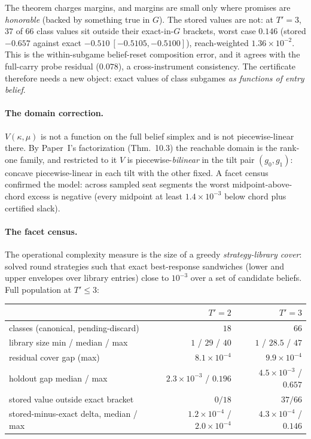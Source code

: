 \documentclass[11pt]{article}
\theoremstyle{plain}
\theoremstyle{definition}
\theoremstyle{remark}
\newcommand{\game}{\ensuremath{G}}
\begin{document}
The theorem charges margins, and margins are small only where promises
are \emph{honorable} (backed by something true in $\game$). The
stored values are not: at $T'{=}3$, $37$ of $66$ class values sit
outside their exact-in-$\game$ brackets, worst case $0.146$ (stored
$-0.657$ against exact $-0.510\ [-0.5105,-0.5100]$), reach-weighted
$1.36\times10^{-2}$. This is the within-subgame belief-reset
composition error, and it agrees with the full-carry probe residual
($0.078$), a cross-instrument consistency. The certificate
therefore needs a new object: exact values of class subgames \emph{as
functions of entry belief}.

\paragraph{The domain correction.} $V(\kappa,\mu)$ is not a function
on the full belief simplex and is not piecewise-linear there. By
Paper~I's factorization (Thm.~10.3) the reachable domain is the
rank-one family, and restricted to it $V$ is
piecewise-\emph{bilinear} in the tilt pair $(g_0,g_1)$: concave
piecewise-linear in each tilt with the other fixed. A facet census
confirmed the model: across sampled seat segments the worst
midpoint-above-chord excess is negative (every midpoint at least
$1.4\times10^{-3}$ below chord plus certified slack).

\paragraph{The facet census.} The operational complexity measure is
the size of a greedy \emph{strategy-library cover}: solved round
strategies such that exact best-response sandwiches (lower and upper
envelopes over library entries) close to $10^{-3}$ over a set of
candidate beliefs. Full population at $T'\le3$:

\begin{center}\small
\begin{tabular}{@{}lrr@{}}
\toprule
 & $T'=2$ & $T'=3$\\
\midrule
classes (canonical, pending-discard) & $18$ & $66$\\
library size min / median / max & $1$ / $29$ / $40$ & $1$ / $28.5$ / $47$\\
residual cover gap (max) & $8.1\times10^{-4}$ & $9.9\times10^{-4}$\\
holdout gap median / max & $2.3\times10^{-3}$ / $0.196$ & $4.5\times10^{-3}$ / $0.657$\\
stored value outside exact bracket & $0/18$ & $37/66$\\
stored-minus-exact delta, median / max & $1.2\times10^{-4}$ / $2.0\times10^{-4}$ & $4.3\times10^{-4}$ / $0.146$\\
\bottomrule
\end{tabular}
\end{center}
\end{document}
